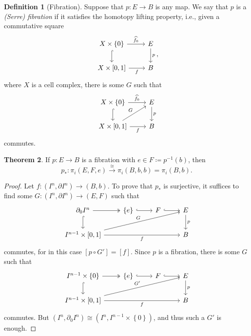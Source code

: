 \documentclass[10pt,letterpaper,cm]{nupset}
\theoremstyle{definition}
\newtheorem{defn}{Definition}[subsection]
\theoremstyle{theorem}
\newtheorem{theorem}[defn]{Theorem}
\theoremstyle{remark}
\newcommand{\1}{\mathbb{1}}
\newcommand{\0}{\vec 0}
\begin{document}
\begin{defn}[Fibration]
Suppose that $p: E \to B$ is any map. We say that $p$ is a \textit{(Serre) fibration} if it satisfies the homotopy lifting property, i.e., given a commutative square
\[
\begin{tikzcd}
X\times \left\{0\right\} \arrow[d, hook] \arrow[r, "\widehat{f_0}"] & E \arrow[d, "p"] \\
{X\times \left[0,1\right]} \arrow[r, "f"']                      & B               
\end{tikzcd}
,\]  where $X$ is a cell complex, there is some $G$ such that
\[
\begin{tikzcd}
X\times \left\{0\right\} \arrow[d, hook] \arrow[r, "\widehat{f_0}"] & E \arrow[d, "p"] \\
{X\times \left[0,1\right]} \arrow[r, "f"'] \arrow[ru, "G"]      & B               
\end{tikzcd}
\] commutes. 
\end{defn}

\begin{theorem}
If $p: E \to B$ is a fibration with $e \in F \coloneqq p^{-1}(b)$, then $$p_{\ast} : \pi_i(E, F, e) \overset{\cong}{\longrightarrow} \pi_i(B, b, b) = \pi_i(B, b).$$
\end{theorem}
\begin{proof}
Let $f: \left(I^n, \partial{I^n}\right) \to \left(B, b\right)$. To prove that $p_{\ast}$ is surjective, it suffices to find some $G : \left(I^n, \partial{I^n}\right) \to \left(E, F\right)$ such that 
\[
\begin{tikzcd}
\partial_0{I^n} \arrow[r, two heads] \arrow[d, hook]       & \left\{e\right\} \arrow[r, hook] & F \arrow[r, hook] & E \arrow[d, "p"] \\
{I^{n-1} \times \left[0,1\right]} \arrow[rrr, "f"'] \arrow[rrru, "G"] &                       &                   & B               
\end{tikzcd}
\] commutes, for in this case $\left[p \circ G'\right] = \left[f\right]$. Since $p$ is a fibration, there is some $G$ such that
\[
\begin{tikzcd}
I^{n-1} \times \left\{0\right\} \arrow[r, two heads] \arrow[d, hook]       & \left\{e\right\} \arrow[r, hook] & F \arrow[r, hook] & E \arrow[d, "p"] \\
{I^{n-1} \times \left[0,1\right]} \arrow[rrr, "f"'] \arrow[rrru, "G'"] &                       &                   & B               
\end{tikzcd}
\] 
commutes. But $\left(I^n, \partial_0{I^n}\right) \cong \left(I^n, I^{n-1} \times \left\{0\right\}\right)$, and thus such a $G'$ is enough. 
\end{proof}
\end{document}
